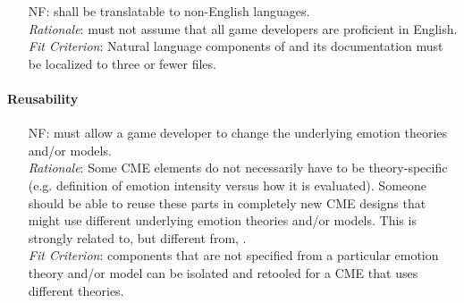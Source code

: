 \begin{itemize}[wide=0pt, leftmargin=*]
    \clearpage
    \item[NF\refstepcounter{nfnum}\thenfnum \label{N_Languages}:] \progname{}
    shall be translatable to non-English languages. \vspace*{1mm}\\
    \textit{Rationale}: \progname{} must not assume that all game developers
    are proficient in English. \vspace*{1mm}\\
    \textit{Fit Criterion}: Natural language components of \progname{} and its
    documentation must be localized to three or fewer files.

\end{itemize}

\paragraph{Reusability}
\noindent \begin{itemize}[wide=0pt, leftmargin=*]

    \item[NF\refstepcounter{nfnum}\thenfnum \label{N_Reuse}:] \progname{} must
    allow a game developer to change the underlying emotion theories and/or
    models. \vspace*{1mm}\\
    \textit{Rationale}: Some CME elements do not necessarily have to be
    theory-specific (e.g. definition of emotion intensity versus how it is
    evaluated). Someone should be able to reuse these parts in completely new
    CME designs that might use different underlying emotion theories and/or
    models. This is strongly related to, but different from,
    .\vspace*{1mm}\\
    \textit{Fit Criterion}: \progname{} components that are not specified from
    a particular emotion theory and/or model can be isolated and retooled for a
    CME that uses different theories.

\end{itemize}


